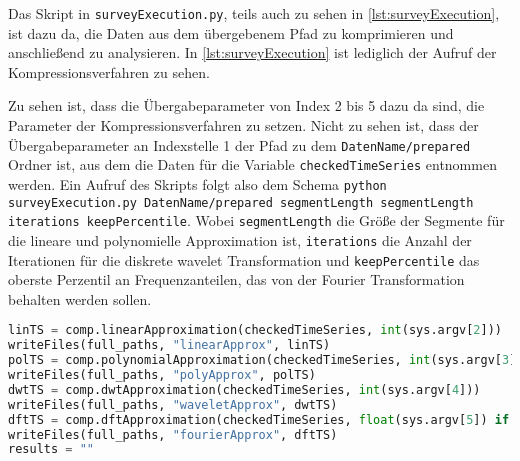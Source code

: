 Das Skript in \texttt{surveyExecution.py}, teils auch zu sehen in \autoref{lst:surveyExecution}, ist dazu da, die Daten aus dem übergebenem Pfad zu komprimieren und anschließend zu analysieren. In \autoref{lst:surveyExecution} ist lediglich der Aufruf der Kompressionsverfahren zu sehen. 

Zu sehen ist, dass die Übergabeparameter von Index 2 bis 5 dazu da sind, die Parameter der Kompressionsverfahren zu setzen. Nicht zu sehen ist, dass der Übergabeparameter an Indexstelle 1 der Pfad zu dem \texttt{DatenName/prepared} Ordner ist, aus dem die Daten für die Variable \lstinline|checkedTimeSeries| entnommen werden. Ein Aufruf des Skripts folgt also dem Schema \lstinline|python surveyExecution.py DatenName/prepared segmentLength segmentLength iterations keepPercentile|. Wobei \lstinline|segmentLength| die Größe der Segmente für die lineare und polynomielle Approximation ist, \lstinline|iterations| die Anzahl der Iterationen für die diskrete wavelet Transformation und \lstinline|keepPercentile| das oberste Perzentil an Frequenzanteilen, das von der Fourier Transformation behalten werden sollen.
\begin{lstlisting}[caption=Skript zur Ausführung des Experiments, language=Python, label=lst:surveyExecution, style=Python]
linTS = comp.linearApproximation(checkedTimeSeries, int(sys.argv[2]))
writeFiles(full_paths, "linearApprox", linTS)
polTS = comp.polynomialApproximation(checkedTimeSeries, int(sys.argv[3]))
writeFiles(full_paths, "polyApprox", polTS)
dwtTS = comp.dwtApproximation(checkedTimeSeries, int(sys.argv[4]))
writeFiles(full_paths, "waveletApprox", dwtTS)
dftTS = comp.dftApproximation(checkedTimeSeries, float(sys.argv[5]) if len(sys.argv) == 6 else 10)
writeFiles(full_paths, "fourierApprox", dftTS)
results = ""
\end{lstlisting}